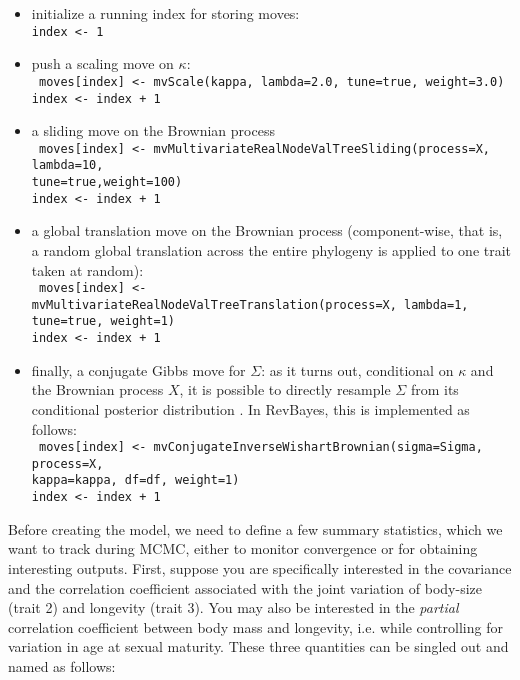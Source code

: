 \documentclass[usletter]{article}
\newcommand{\cmd}[1]{\texttt{#1}}
\begin{document}
\begin{itemize}
\item
initialize a running index for storing moves:
\\
\cmd{index <- 1}
\item
push a scaling move on $\kappa$:
\\
\cmd{
moves[index] <- mvScale(kappa, lambda=2.0, tune=true, weight=3.0)
\\
index <- index + 1
}
\item
a sliding move on the Brownian process
\\
\cmd{
moves[index] <- mvMultivariateRealNodeValTreeSliding(process=X, lambda=10,
\\
tune=true,weight=100)
\\
index <- index + 1
}
\item
a global translation move on the Brownian process (component-wise, that is, a random global translation across the entire phylogeny is applied to one trait taken at random):
\\
\cmd{
moves[index] <- mvMultivariateRealNodeValTreeTranslation(process=X, lambda=1,
\\
tune=true, weight=1)
\\
index <- index + 1
}
\item
finally, a conjugate Gibbs move for $\Sigma$: as it turns out, conditional on $\kappa$ and the Brownian process $X$, it is possible to directly resample $\Sigma$ from its conditional posterior distribution \citep{Lartillot:2011p55}. In RevBayes, this is implemented as follows:
\\
\cmd{
moves[index] <- mvConjugateInverseWishartBrownian(sigma=Sigma, process=X,
\\
kappa=kappa, df=df, weight=1)
\\
index <- index + 1
}
\end{itemize}
Before creating the model, we need to define a few summary statistics, which we want to track during MCMC, either to monitor convergence or for obtaining interesting outputs.
First, suppose you are specifically interested in the covariance and the correlation coefficient associated with the joint variation of body-size (trait 2) and longevity (trait 3). You may also be interested in the \emph{partial} correlation coefficient between body mass and longevity, i.e. while controlling for variation in age at sexual maturity. These three quantities can be singled out and named as follows:
\end{document}
